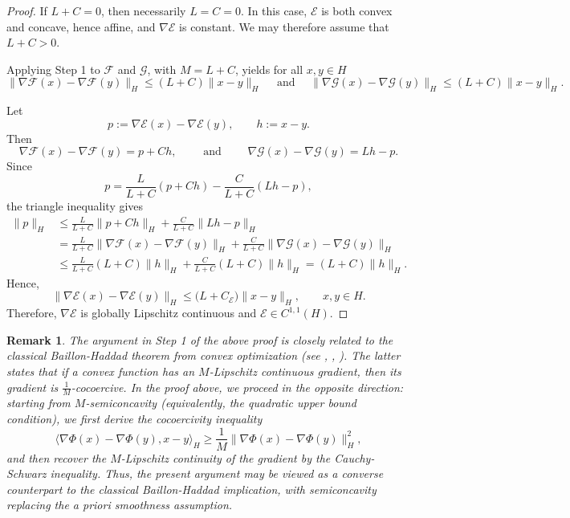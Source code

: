 \documentclass[12pt]{amsart}
\numberwithin{equation}{section}
\newtheorem{remark}[theorem]{Remark}
\begin{document}
\begin{proof}
If $L+C=0$, then necessarily $L=C=0$. In this case, $\mathscr{E}$ is both convex and concave, hence affine, and $\nabla\mathscr{E}$ is constant. We may therefore assume that $L+C>0$.

Applying Step 1 to $\mathscr{F}$ and $\mathscr{G}$, with $M=L+C$, yields for all $x,y\in H$
\[
\|\nabla\mathscr{F}(x)-\nabla\mathscr{F}(y)\|_H \le (L+C)\|x-y\|_H
\quad \text{ and } \quad 
\|\nabla\mathscr{G}(x)-\nabla\mathscr{G}(y)\|_H \le (L+C)\|x-y\|_H.
\]

Let
\[
p:=\nabla\mathscr{E}(x)-\nabla\mathscr{E}(y), \qquad h:=x-y.
\]
Then
\[
\nabla\mathscr{F}(x)-\nabla\mathscr{F}(y) = p+Ch, \qquad \text{ and } \qquad  \nabla\mathscr{G}(x)-\nabla\mathscr{G}(y) = Lh-p.
\]
Since
\[
p = \frac{L}{L+C}(p+Ch) - \frac{C}{L+C}(Lh-p),
\]
the triangle inequality gives
\[
\begin{aligned}
    \|p\|_H
    & \le \frac{L}{L+C}\|p+Ch\|_H + \frac{C}{L+C}\|Lh-p\|_H \\
    & = \frac{L}{L+C}\|\nabla\mathscr{F}(x)-\nabla\mathscr{F}(y)\|_H + \frac{C}{L+C}\|\nabla\mathscr{G}(x)-\nabla\mathscr{G}(y)\|_H \\
    & \le \frac{L}{L+C}(L+C)\|h\|_H + \frac{C}{L+C}(L+C)\|h\|_H 
     = (L+C)\|h\|_H.
\end{aligned}
\]
Hence,
\[
\|\nabla\mathscr{E}(x)-\nabla\mathscr{E}(y)\|_H \le \bigl(L+C_{\mathscr{E}}\bigr)\|x-y\|_H, \qquad x,y\in H.
\]
Therefore, $\nabla\mathscr{E}$ is globally Lipschitz continuous and $\mathscr{E}\in C^{1,1}(H)$. 
\end{proof}

\begin{remark}
The argument in Step 1 of the above proof is closely related to the classical Baillon-Haddad theorem from convex optimization (see \cite[Corollaire 10]{baillon1977quelques}, \cite{bauschke2010baillon}, \cite[Corollary 18.17, p.323]{bauschke2011convex}). The latter states that if a convex function has an $M$-Lipschitz continuous gradient, then its gradient is $\frac{1}{M}$-cocoercive. In the proof above, we proceed in the opposite direction: starting from $M$-semiconcavity (equivalently, the quadratic upper bound condition), we first derive the cocoercivity inequality 
\[
\langle \nabla\Phi(x)-\nabla\Phi(y), x-y \rangle_H \ge \frac{1}{M} \|\nabla\Phi(x)-\nabla\Phi(y)\|_H^2,
\]
and then recover the $M$-Lipschitz continuity of the gradient by the Cauchy-Schwarz inequality. Thus, the present argument may be viewed as a converse counterpart to the classical Baillon-Haddad implication, with semiconcavity replacing the a priori smoothness assumption.
\end{remark}




\end{document}
